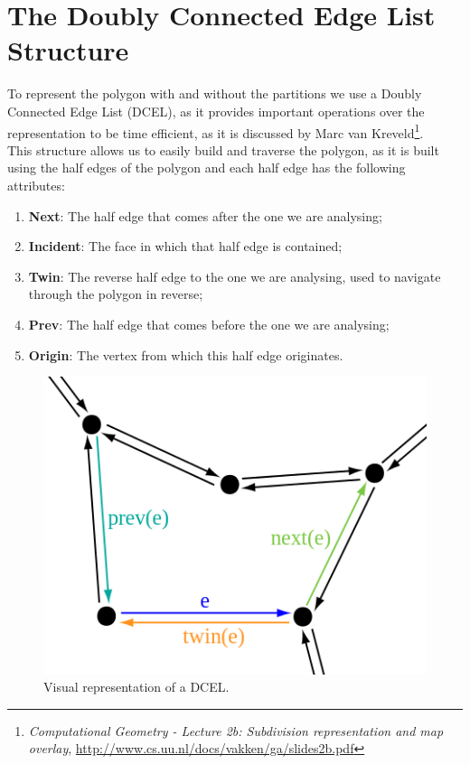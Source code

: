 \documentclass[12pt,a4paper,oneside]{article}
\begin{document}
\section{The Doubly Connected Edge List Structure}\label{sec:dcel}
To represent the polygon with and without the partitions we use a Doubly Connected Edge List (DCEL), as it provides important operations over the representation to be time efficient, as it is discussed by Marc van Kreveld\footnote{\textit{Computational Geometry -
Lecture 2b: Subdivision representation and map overlay}, \url{http://www.cs.uu.nl/docs/vakken/ga/slides2b.pdf}}.\\
This structure allows us to easily build and traverse the polygon, as it is built using the half edges of the polygon and each half edge has the following attributes:

\begin{enumerate}  
\item \textbf{Next}: The half edge that comes after the one we are analysing;
\item \textbf{Incident}: The face in which that half edge is contained;
\item \textbf{Twin}: The reverse half edge to the one we are analysing, used to navigate through the polygon in reverse;
\item \textbf{Prev}: The half edge that comes before the one we are analysing;
\item \textbf{Origin}: The vertex from which this half edge originates.
\end{enumerate}

\begin{figure}[h!]
  \centering \includegraphics[scale=0.5]{dcel.png}
  \caption{Visual representation of a DCEL.}
  \label{fig:Dcel}
\end{figure}
\end{document}
